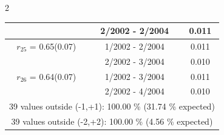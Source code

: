 \begin{multicols}{2}
{\begin{tabular}{ccc}
&        2/2002 -  2/2004 &        0.011  \vspace{-.02in} \\ \hline 
  $r_{25}$ = 0.65(0.07) &       1/2002 -  2/2004 &        0.011   \vspace{-.10in} \\  
&        2/2002 -  3/2004 &        0.010  \vspace{-.02in} \\ \hline 
  $r_{26}$ = 0.64(0.07) &       1/2002 -  3/2004 &        0.011   \vspace{-.10in} \\  
&        2/2002 -  4/2004 &        0.010  \vspace{-.02in} \\ \hline 
\multicolumn{3}{c}{              39 values outside (-1,+1): 100.00  \% (31.74  \% expected)}\vspace{-.10in} \\ 
\multicolumn{3}{c}{              39 values outside (-2,+2): 100.00 \%  (4.56 \% expected) } \\
 \end{tabular} \\ 
 } 
\end{multicols} 
